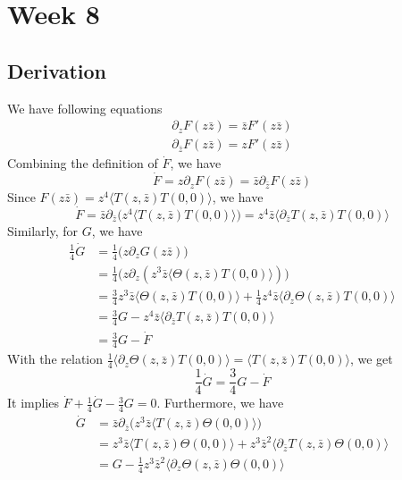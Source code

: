 \newpage
\section{Week 8}
\subsection{Derivation}
We have following equations
\begin{eqnarray}
	\partial_z F(z\bar{z}) = \bar{z}F'(z\bar{z})\\
	\partial_{\bar{z}} F(z\bar{z})= zF'(z\bar{z})
\end{eqnarray}
Combining the definition of $\dot{F}$, we have
\begin{equation}
	\dot{F} = z \partial_z F(z\bar{z}) = \bar{z} \partial_{\bar{z}} F(z\bar{z})
\end{equation}
Since $F(z\bar{z})= z^4 \langle T(z,\bar{z}) T(0,0) \rangle$, we have 
\begin{equation}
	\dot{F} = \bar{z} \partial_{\bar{z}} \big(z^4 \langle T(z,\bar{z}) T(0,0)\rangle \big) = z^4\bar{z} \langle \partial_{\bar{z}}T(z,\bar{z})T(0,0) \rangle
\end{equation}
Similarly, for $G$, we have
\begin{equation}
	\begin{split}
	\frac{1}{4} \dot{G} &= \frac{1}{4}\big(z \partial_z G(z\bar{z})\big)\\
	&=\frac{1}{4} \big(z\partial_z (z^3\bar{z}\langle \Theta(z,\bar{z})T(0,0) \rangle ) \big)\\
	&= \frac{3}{4} z^3 \bar{z}\langle \Theta(z,\bar{z}) T(0,0) \rangle + \frac{1}{4} z^4 \bar{z} \langle \partial_z \Theta(z,\bar{z}) T(0,0) \rangle \\
	&= \frac{3}{4}G - z^4 \bar{z} \langle \partial_{\bar{z}} T(z,\bar{z})T(0,0) \rangle \\
	&= \frac{3}{4} G -\dot{F}
	\end{split}
\end{equation}
With the relation $\frac{1}{4} \langle\partial_z \Theta(z,\bar{z}) T(0,0) \rangle = \langle T(z,\bar{z}) T(0,0) \rangle$, we get
\begin{equation}
\frac{1}{4} \dot{G} = \frac{3}{4} G -\dot{F}
\end{equation}
It implies $\dot{F} + \frac{1}{4} \dot{G} - \frac{3}{4} G=0$. Furthermore, we have
\begin{equation}
\label{eq10}
	\begin{split}
	\dot{G} & = \bar{z} \partial_{\bar{z}} \big(z^3 \bar{z} \langle T(z,\bar{z}) \Theta(0,0) \rangle \big)\\
	& = z^3 \bar{z} \langle T(z,\bar{z}) \Theta(0,0) \rangle + z^3 \bar{z}^2 \langle \partial_{\bar{z}} T(z,\bar{z}) \Theta(0,0) \rangle \\
	&= G - \frac{1}{4} z^3 \bar{z}^2 \langle \partial_z \Theta(z,\bar{z})\Theta(0,0)\rangle
	\end{split}
\end{equation}
